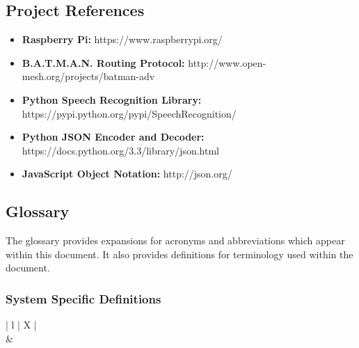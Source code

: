 \documentclass[11pt,a4paper]{article}
\begin{document}
\subsection{Project References}
\begin{itemize}
	\item{\textbf{Raspberry Pi:}}
		\textnormal{https://www.raspberrypi.org/}
	\item{\textbf{B.A.T.M.A.N. Routing Protocol:}}
		\textnormal{http://www.open-mesh.org/projects/batman-adv}
	\item{\textbf{Python Speech Recognition Library:}}
		\textnormal{https://pypi.python.org/pypi/SpeechRecognition/}
	\item{\textbf{Python JSON Encoder and Decoder:}}
		\textnormal{https://docs.python.org/3.3/library/json.html}
    \item{\textbf{JavaScript Object Notation:}}
        \textnormal{http://json.org/}
\end{itemize}

\subsection{Glossary}
The glossary provides expansions for acronyms and abbreviations which appear within this document. It also provides definitions for terminology used within the document. 

\subsubsection{System Specific Definitions}
\begin{center}
\begin{tabularx}{\textwidth}{ | l | X | }
	\hline
	 \\
	\hline
		& \\
	\hline
\end{tabularx}
\end{center}
\end{document}
